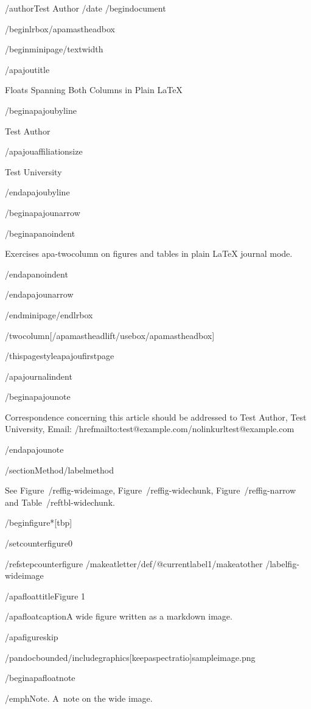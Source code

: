 /author{Test Author}
/date{}
/begin{document}


/begin{lrbox}{/apamastheadbox}%

/begin{minipage}{/textwidth}

/apajoutitle{

Floats Spanning Both Columns in Plain LaTeX

}

/begin{apajoubyline}

Test Author

/apajouaffiliationsize

Test University

/end{apajoubyline}

/begin{apajounarrow}

/begin{apanoindent}

Exercises apa-twocolumn on figures and tables in plain LaTeX journal
mode.

/end{apanoindent}

/end{apajounarrow}

/end{minipage}/end{lrbox}

/twocolumn[/apamastheadlift/usebox{/apamastheadbox}]

/thispagestyle{apajoufirstpage}

/apajournalindent

/begin{apajounote}

Correspondence concerning this article should be addressed to Test
Author, Test University, Email:
/href{mailto:test@example.com}{/nolinkurl{test@example.com}}

/end{apajounote}

/section{Method}/label{method}

See Figure~/ref{fig-wideimage}, Figure~/ref{fig-widechunk},
Figure~/ref{fig-narrow} and Table~/ref{tbl-widechunk}.

/begin{figure*}[tbp]

/setcounter{figure}{0}

/refstepcounter{figure}%
/makeatletter/def/@currentlabel{1}/makeatother%
/label{fig-wideimage}

/apafloattitle{Figure 1}

/apafloatcaption{A wide figure written as a markdown image.}

/apafigureskip

/pandocbounded{/includegraphics[keepaspectratio]{sampleimage.png}}

/begin{apafloatnote}

/emph{Note}. A~note on the wide image.

